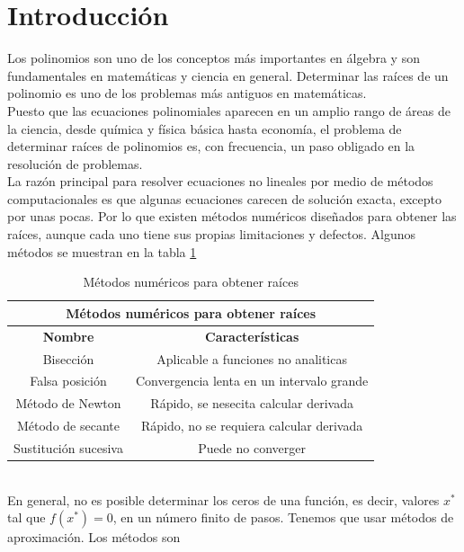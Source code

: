 \documentclass[12pt]{article}
\begin{document}
		\section*{\centering Introducción}\label{sec:Introducción}
			Los polinomios son uno de los conceptos más importantes en álgebra y son fundamentales en 
			matemáticas y ciencia en general. Determinar las raíces de un polinomio es uno de los problemas 
			más antiguos en matemáticas.\\
			Puesto que las ecuaciones polinomiales aparecen en un amplio rango de áreas de la ciencia, desde 
			química y física básica hasta economía, el problema de determinar raíces de polinomios es, con 
			frecuencia, un paso obligado en la resolución de problemas.\cite{bib:item1}\\
			La razón principal para resolver ecuaciones no lineales por medio de métodos computacionales es 
			que algunas ecuaciones carecen de solución exacta, excepto por unas pocas. Por lo que existen 
			métodos numéricos diseñados para obtener las raíces, aunque cada uno tiene sus propias 
			limitaciones y defectos. Algunos métodos se muestran en la tabla \ref{tab:1}\cite{bib:item2}\\
			\begin{table}[h!]
				\centering
				\begin{tabular}{|c|c|}
					\hline
					\multicolumn{2}{|c|}{\textbf{Métodos numéricos para obtener raíces}}\\
					\hline
					\textbf{Nombre} & \textbf{Características} \\\hline
					Bisección & Aplicable a funciones no analiticas \\\hline
					Falsa posición & Convergencia lenta en un intervalo grande \\\hline								
					Método de Newton & Rápido, se nesecita calcular derivada \\\hline
					Método de secante & Rápido, no se requiera calcular derivada \\\hline
					Sustitución sucesiva & Puede no converger \\\hline
				\end{tabular}
				\caption{Métodos numéricos para obtener raíces \cite{bib:item2}}
				\label{tab:1}
			\end{table}\\
			En general, no es posible determinar los ceros de una función, es decir, valores $ x^* $ tal que $f(x^*) = 0 $, 
			en un número finito de pasos. Tenemos que usar métodos de aproximación. Los métodos son 
\end{document}

